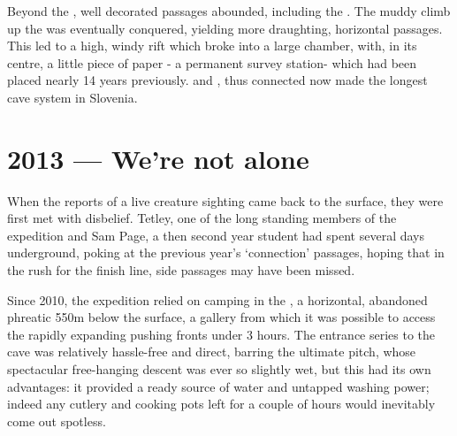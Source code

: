 
Beyond the , well decorated passages abounded, including the . The muddy climb up the  was eventually conquered, yielding more draughting, horizontal passages. This led to a high, windy rift which broke into a large chamber, with, in its centre, a little piece of paper - a permanent survey station- which had been placed nearly 14 years previously.  and , thus connected now made the longest cave system in Slovenia.

\mydelimiter




\section{2013 --- We're not alone}

When the reports of a live creature sighting came back to the surface,  they were first met with disbelief. Tetley, one of the long standing members of the expedition and Sam Page, a then second year student had spent several days underground, poking at the previous year's `connection' passages, hoping that in the rush for the finish line, side passages may have been missed. 

Since 2010, the expedition relied on camping in the , a horizontal, abandoned phreatic 550m below the surface, a gallery from which it was possible to access the rapidly expanding pushing fronts under 3 hours. The entrance series to the cave was relatively hassle-free and direct, barring the ultimate pitch, whose spectacular free-hanging descent was ever so slightly wet, but this had its own advantages: it provided a ready source of water and untapped washing power; indeed any cutlery and cooking pots left for a couple of hours would inevitably come out spotless.


